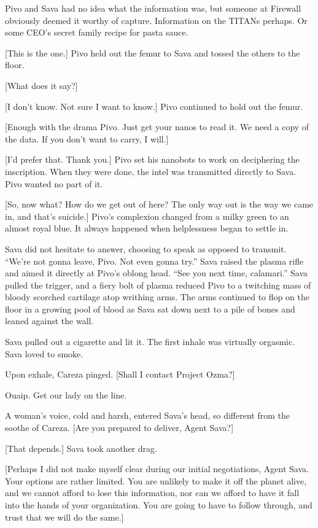 Pivo and Sava had no idea what the information was, but someone at Firewall obviously deemed it worthy of capture. Information on the TITANs perhaps. Or some CEO's secret family recipe for pasta sauce. 

[This is the one.] Pivo held out the femur to Sava and tossed the others to the floor. 

[What does it say?] 

[I don't know. Not sure I want to know.] Pivo continued to hold out the femur. 

[Enough with the drama Pivo. Just get your nanos to read it. We need a copy of the data. If you don't want to carry, I will.] 

[I'd prefer that. Thank you.] Pivo set his nanobots to work on deciphering the inscription. When they were done, the intel was transmitted directly to Sava. Pivo wanted no part of it. 

[So, now what? How do we get out of here? The only way out is the way we came in, and that's suicide.] Pivo's complexion changed from a milky green to an almost royal blue. It always happened when helplessness began to settle in. 

Sava did not hesitate to answer, choosing to speak as opposed to transmit. ``We're not gonna leave, Pivo. Not even gonna try.'' Sava raised the plasma rifle and aimed it directly at Pivo's oblong head. ``See you next time, calamari.'' Sava pulled the trigger, and a fiery bolt of plasma reduced Pivo to a twitching mass of bloody scorched cartilage atop writhing arms. The arms continued to flop on the floor in a growing pool of blood as Sava sat down next to a pile of bones and leaned against the wall. 

Sava pulled out a cigarette and lit it. The first inhale was virtually orgasmic. Sava loved to smoke. 

Upon exhale, Careza pinged. [Shall I contact Project Ozma?] 

Ouaip. Get our lady on the line. 

A woman's voice, cold and harsh, entered Sava's head, so different from the soothe of Careza. [Are you prepared to deliver, Agent Sava?] 

[That depends.] Sava took another drag. 

[Perhaps I did not make myself clear during our initial negotiations, Agent Sava. Your options are rather limited. You are unlikely to make it off the planet alive, and we cannot afford to lose this information, nor can we afford to have it fall into the hands of your organization. You are going to have to follow through, and trust that we will do the same.] 

